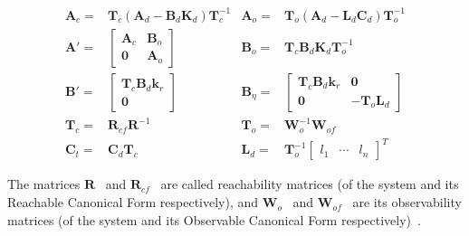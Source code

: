 \documentclass[sigconf]{llncs}
\newcommand{\mat}[1]{\boldsymbol{#1}}
\begin{document}
{\setlength{\belowdisplayskip}{0pt}
\begin{align*}
\mat{A}_{c}=&\mat{T}_c\left(\mat{A}_d-\mat{B}_d\mat{K}_d\right)\mat{T}_c^{-1}&
\mat{A}_{o}=&\mat{T}_o\left(\mat{A}_d-\mat{L}_d\mat{C}_d\right)\mat{T}_o^{-1}\\
\mat{A}'=&\left [\begin{array}{cc}\mat{A}_{c}&\mat{B}_{o}\\ \mat{0}&\mat{A}_{o}\end{array}\right]&
\mat{B}_{o}=&\mat{T}_c\mat{B}_d\mat{K}_d\mat{T}_o^{-1}\\
\mat{B}'=&\left[\begin{array}{c}\mat{T}_c\mat{B}_d\mat{k}_r\\\mat{0}\end{array}\right]&
\mat{B}_{\eta}=&\left[\begin{array}{cc}\mat{T}_c\mat{B}_d\mat{k}_r&\mat{0}\\\mat{0}&-\mat{T}_o\mat{L}_d\end{array}\right]\\
\mat{T}_c=&\mat{R}_{cf}\mat{R}^{-1}&
\mat{T}_o=&\mat{W}_o^{-1}\mat{W}_{of}\\
\mat{C}_t=&\mat{C}_d\mat{T}_c&
\mat{L}_d=& \mat{T}_o^{-1}\left[ \begin{array}{ccc}l_1&\cdots&l_n\end{array}\right]^T
\end{align*}
}

The matrices $\mat{R}$%
~and $\mat{R}_{cf}$%
~are called reachability matrices (of the system and its Reachable Canonical Form respectively),
and $\mat{W}_o$%
~and $\mat{W}_{of}$%
~are its observability matrices  (of the system and its Observable Canonical Form respectively)~\cite{astrom1997computer}.
\end{document}

